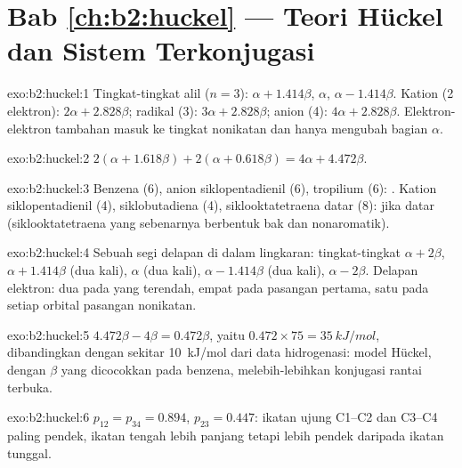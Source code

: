 \section*{Bab \ref{ch:b2:huckel} --- Teori Hückel dan Sistem Terkonjugasi}

\begin{solution}{exo:b2:huckel:1}
Tingkat-tingkat alil ($n = 3$): $\alpha + 1.414\beta$, $\alpha$, $\alpha - 1.414\beta$.
Kation (2 elektron): $2\alpha + 2.828\beta$; radikal (3): $3\alpha + 2.828\beta$;
anion (4): $4\alpha + 2.828\beta$. Elektron-elektron tambahan masuk ke tingkat
nonikatan dan hanya mengubah bagian $\alpha$.
\end{solution}

\begin{solution}{exo:b2:huckel:2}
$2(\alpha + 1.618\beta) + 2(\alpha + 0.618\beta) = 4\alpha + 4.472\beta$.
\end{solution}

\begin{solution}{exo:b2:huckel:3}
Benzena (6), anion siklopentadienil (6), tropilium (6): . Kation
siklopentadienil (4), siklobutadiena (4), siklooktatetraena datar (8):
 jika datar (siklooktatetraena yang sebenarnya berbentuk bak
dan nonaromatik).
\end{solution}

\begin{solution}{exo:b2:huckel:4}
Sebuah segi delapan di dalam lingkaran: tingkat-tingkat $\alpha + 2\beta$,
$\alpha + 1.414\beta$ (dua kali), $\alpha$ (dua kali), $\alpha - 1.414\beta$ (dua
kali), $\alpha - 2\beta$. Delapan elektron: dua pada yang terendah, empat
pada pasangan pertama, satu pada setiap orbital pasangan nonikatan.
\end{solution}

\begin{solution}{exo:b2:huckel:5}
$4.472\beta - 4\beta = 0.472\beta$, yaitu $0.472 \times 75 = \qty{35}{kJ/mol}$,
dibandingkan dengan sekitar \qty{10}{kJ/mol} dari data hidrogenasi: model
Hückel, dengan $\beta$ yang dicocokkan pada benzena, melebih-lebihkan
konjugasi rantai terbuka.
\end{solution}

\begin{solution}{exo:b2:huckel:6}
$p_{12} = p_{34} = 0.894$, $p_{23} = 0.447$: ikatan ujung C1--C2 dan C3--C4
paling pendek, ikatan tengah lebih panjang tetapi lebih pendek daripada
ikatan tunggal.
\end{solution}

